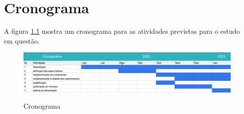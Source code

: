 \chapter{Cronograma}

A figura \ref{fig:introduction:agenda} mostra um cronograma para as atividades previstas para o estudo em questão.

\begin{figure}[H]
    \centering
    \caption{Cronograma}
    \includegraphics[width=1.0\textwidth]{resources/images/introducao/agenda.png}
    \label{fig:introduction:agenda}
\end{figure}



